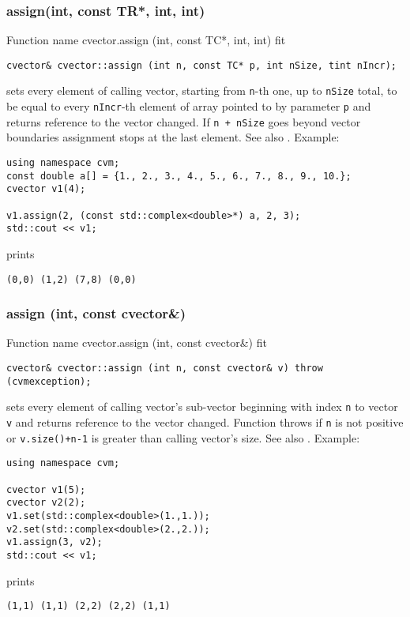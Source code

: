 \subsubsection{assign(int, const TR*, int, int)}
Function%
\pdfdest name {cvector.assign (int, const TC*, int, int)} fit
\begin{verbatim}
cvector& cvector::assign (int n, const TC* p, int nSize, tint nIncr);
\end{verbatim}
sets every element of calling vector, starting from \Based \verb"n"-th one,
up to \verb"nSize" total,
to be equal to
every \verb"nIncr"-th element of  array pointed to by parameter \verb"p"
and returns  reference to the vector changed.
If \verb"n + nSize" goes beyond vector boundaries assignment stops at the last element.
See also .
Example:
\begin{Verbatim}
using namespace cvm;
const double a[] = {1., 2., 3., 4., 5., 6., 7., 8., 9., 10.};
cvector v1(4);

v1.assign(2, (const std::complex<double>*) a, 2, 3);
std::cout << v1;
\end{Verbatim}
prints
\begin{Verbatim}
(0,0) (1,2) (7,8) (0,0)
\end{Verbatim}
\newpage



\subsubsection{assign (int, const cvector\&)}
Function%
\pdfdest name {cvector.assign (int, const cvector&)} fit
\begin{verbatim}
cvector& cvector::assign (int n, const cvector& v) throw (cvmexception);
\end{verbatim}
sets every element of  calling vector's sub-vector beginning with
\Based index \verb"n" to  vector \verb"v" and returns 
reference to the vector changed. Function throws 
 if \verb"n" is not
positive or \verb"v.size()+n-1" is greater than  calling vector's
size. See also . Example:
\begin{Verbatim}
using namespace cvm;

cvector v1(5);
cvector v2(2);
v1.set(std::complex<double>(1.,1.));
v2.set(std::complex<double>(2.,2.));
v1.assign(3, v2);
std::cout << v1;
\end{Verbatim}
prints
\begin{Verbatim}
(1,1) (1,1) (2,2) (2,2) (1,1)
\end{Verbatim}
\newpage



